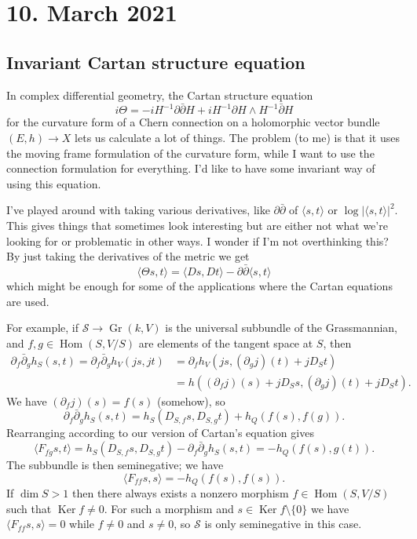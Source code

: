 \documentclass[11pt]{amsart}
\theoremstyle{definition}
\newcommand{\cc}[1]{\mathcal{#1}}
\DeclareMathOperator{\Gr}{Gr}
\DeclareMathOperator{\Ker}{Ker}
\DeclareMathOperator{\Hom}{Hom}
\begin{document}
\section*{10. March 2021}

\subsection*{Invariant Cartan structure equation}

In complex differential geometry, the Cartan structure equation
$$
i\Theta
= -iH^{-1} \partial \bar\partial H
+ i H^{-1} \partial H \wedge H^{-1} \bar\partial H
$$
for the curvature form of a Chern connection on a holomorphic vector bundle $(E, h) \to X$ lets us calculate a lot of things. The problem (to me) is that it uses the moving frame formulation of the curvature form, while I want to use the connection formulation for everything. I'd like to have some invariant way of using this equation.

I've played around with taking various derivatives, like $\partial\bar\partial$ of $\langle s, t \rangle$ or $\log |\langle s, t\rangle|^2$. This gives things that sometimes look interesting but are either not what we're looking for or problematic in other ways. I wonder if I'm not overthinking this? By just taking the derivatives of the metric we get
$$
\langle \Theta s, t \rangle
= \langle D s, D t \rangle
- \partial\bar\partial \langle s, t \rangle
$$
which might be enough for some of the applications where the Cartan equations are used.

For example, if $\cc S \to \Gr(k, V)$ is the universal subbundle of the Grassmannian, and $f,g \in \Hom(S,V/S)$ are elements of the tangent space at $S$, then
\begin{align*}
\partial_f\bar\partial_g h_S(s,t)
= \partial_f \bar\partial_g h_V(js,jt)
&= \partial_f h_V(js, (\partial_g j)(t) + jD_St)
\\
&= h((\partial_f j)(s) + jD_S s,(\partial_g j)(t) + jD_St).
\end{align*}
We have $(\partial_fj)(s) = f(s)$ (somehow), so
$$
\partial_f\bar\partial_g h_S(s,t)
= h_S(D_{S,f} s, D_{S,g} t) + h_Q(f(s),f(g)).
$$
Rearranging according to our version of Cartan's equation gives
$$
\langle F_{fg}s,t \rangle
= h_S(D_{S,f} s, D_{S,g} t) - \partial_f\bar\partial_g h_S(s,t)
= -h_Q(f(s),g(t)).
$$
The subbundle is then seminegative; we have
$$
\langle F_{ff}s,s \rangle
= -h_Q(f(s),f(s)).
$$
If $\dim S > 1$ then there always exists a nonzero morphism $f \in \Hom(S, V/S)$ such that $\Ker f \not= 0$. For such a morphism and $s \in \Ker f \setminus \{0\}$ we have $\langle F_{ff}s, s \rangle = 0$ while $f \not=0$ and $s \not= 0$, so $\cc S$ is only seminegative in this case.
\end{document}
